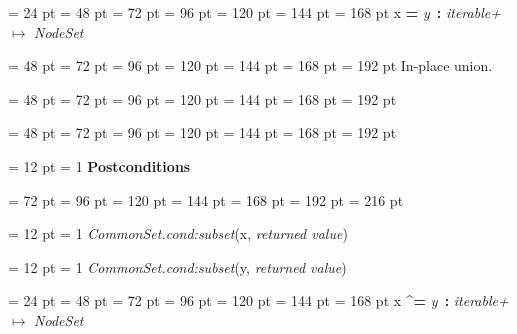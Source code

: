 {{\par \noindent  \leftskip = 24 pt  \leftmargini = 48 pt  \leftmarginii = 72 pt  \leftmarginiii = 96 pt  \leftmarginiv = 120 pt  \leftmarginv = 144 pt  \leftmarginvi = 168 pt x {\large {\bf {\textbar}=\/}} {\em y\/}~{\bf :}  {\em iterable+\/} \(\mapsto \)  {\em NodeSet\/}{\par \noindent
{\par \noindent  \leftskip = 48 pt  \leftmargini = 72 pt  \leftmarginii = 96 pt  \leftmarginiii = 120 pt  \leftmarginiv = 144 pt  \leftmarginv = 168 pt  \leftmarginvi = 192 pt 
In-place union.\par}
{\par \noindent  \leftskip = 48 pt  \leftmargini = 72 pt  \leftmarginii = 96 pt  \leftmarginiii = 120 pt  \leftmarginiv = 144 pt  \leftmarginv = 168 pt  \leftmarginvi = 192 pt {\par \noindent
\par}
\par}
{\par \noindent  \leftskip = 48 pt  \leftmargini = 72 pt  \leftmarginii = 96 pt  \leftmarginiii = 120 pt  \leftmarginiv = 144 pt  \leftmarginv = 168 pt  \leftmarginvi = 192 pt {\par \noindent
{\par \pagebreak[3.100000] \noindent \hangindent = 12 pt \hangafter = 1 
{\bf Postconditions\/}\par}
{\par \noindent  \leftskip = 72 pt  \leftmargini = 96 pt  \leftmarginii = 120 pt  \leftmarginiii = 144 pt  \leftmarginiv = 168 pt  \leftmarginv = 192 pt  \leftmarginvi = 216 pt {\par \noindent
{\par \pagebreak[3.000000] \noindent \hangindent = 12 pt \hangafter = 1 
 {\em CommonSet.cond:subset\/}(x, {\em returned value\/})\par}
{\par \pagebreak[3.000000] \noindent \hangindent = 12 pt \hangafter = 1 
 {\em CommonSet.cond:subset\/}(y, {\em returned value\/})\par}
\par}
\par}
\par}
\par}
\par}
\par}
{\par \noindent  \leftskip = 24 pt  \leftmargini = 48 pt  \leftmarginii = 72 pt  \leftmarginiii = 96 pt  \leftmarginiv = 120 pt  \leftmarginv = 144 pt  \leftmarginvi = 168 pt x {\large {\bf {\textasciicircum}=\/}} {\em y\/}~{\bf :}  {\em iterable+\/} \(\mapsto \)  {\em NodeSet\/}{\par \noindent
}}}
